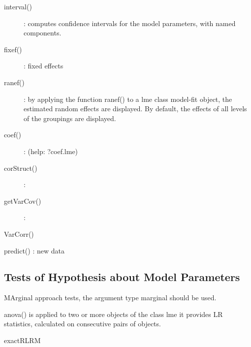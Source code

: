 \begin{description}
\item[interval()]: computes confidence intervals for the model parameters, with named components.
\item[fixef()]: fixed effects
\item[ranef()]: by applying the function ranef() to a lme class model-fit object, the estimated random
effects are displayed. By default, the effects of all levels of the groupings are displayed.
\item[coef()]:  (help: ?coef.lme)
\item[corStruct()]: 
\item[getVarCov()]:
\item[VarCorr()]
\end{description}

predict() : new data


\subsection{Tests of Hypothesis about Model Parameters}
MArginal approach tests, the argument type marginal should be used.



anova() is applied to two or more objects of the class lme it provides LR statistics, calculated on consecutive pairs of objects.





exactRLRM

